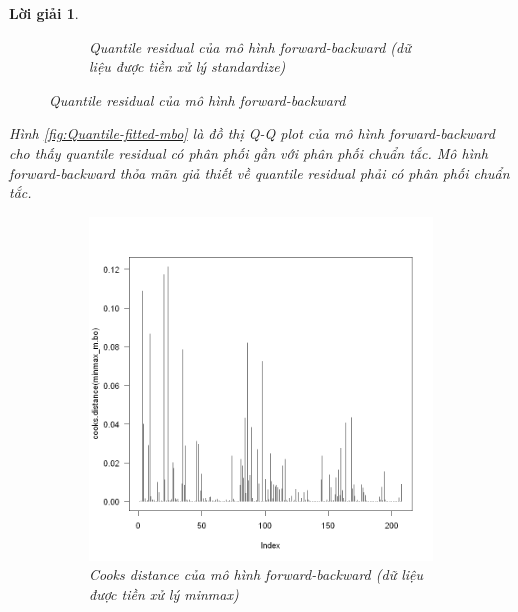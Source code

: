 \documentclass[14pt, a4paper]{article}
\theoremstyle{sltheorem}
\theoremstyle{soltheorem}
\newtheorem*{loigiai}{Lời giải}
\begin{document}
\begin{loigiai}
\begin{figure}[h!]
\begin{subfigure}[b]{0.4\textwidth}
            \caption{Quantile residual của mô hình forward-backward (dữ liệu được tiền xử lý standardize)}
        \end{subfigure}
        \caption{Quantile residual của mô hình forward-backward}
        \label{fig:Quantile-resid-mbo}
    \end{figure}

    Hình \ref{fig:Quantile-fitted-mbo} là đồ thị Q-Q plot của mô hình forward-backward cho thấy quantile residual có phân phối gần với phân phối chuẩn tắc.
    Mô hình forward-backward thỏa mãn giả thiết về quantile residual phải có phân phối chuẩn tắc.

    \begin{figure}[h!]
        \centering
        \begin{subfigure}[b]{0.4\textwidth}
            \centering
            \includegraphics[width=\textwidth]{figures/minmax_mbo_cooks.png}
            \caption{Cooks distance của mô hình forward-backward (dữ liệu được tiền xử lý minmax)}
        \end{subfigure}
        \hfill
        \begin{subfigure}[b]{0.4\textwidth}
            \centering

\end{subfigure}
\end{figure}
\end{loigiai}
\end{document}
